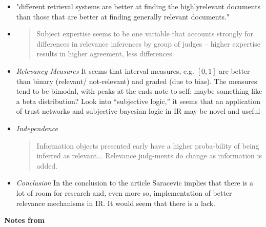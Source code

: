 \documentclass{article}
\newcommand{\note}[1]{{\footnotesize #1}}
\newcommand{\hi}[1]{{\large {\bf #1}}}
\newcommand{\hii}[1]{{\it #1}}
\begin{document}
\begin{itemize}
\item "different  retrieval  systems  are  better  at  finding  the  highlyrelevant documents than those that are better at finding generally relevant documents."

\item 
    \begin{quote}
    Subject  expertise  seems  to  be  one  variable  that  accounts strongly for differences in relevance inferences by group of judges -- higher  expertise results  in  higher  agreement, less differences.
    \end{quote}

\item \hii{Relevancy Measures}  It seems that interval measures, e.g. $[0,1]$ are better than binary (relevant/ not-relevant) and graded (due to bias).  The measures tend to be bimodal, with peaks at the ends \note{note to self: maybe something like a beta distribution? Look into ``subjective logic,'' it seems that an application of trust networks and subjective bayesian logic in IR may be novel and useful}

\item \hii{Independence}
    \begin{quote}
        Information objects presented early have a higher proba-bility of being inferred as relevant...  Relevance judg-ments do change as information is added.
    \end{quote}

\item \hii{Conclusion}  In the conclusion to the article Saracevic implies that there is a lot of room for research and, even more so, implementation of better relevance mechanisms in IR.  It would seem that there is a lack.

\end{itemize}

\hi{Notes from \cite{shannon48}}
\end{document}
